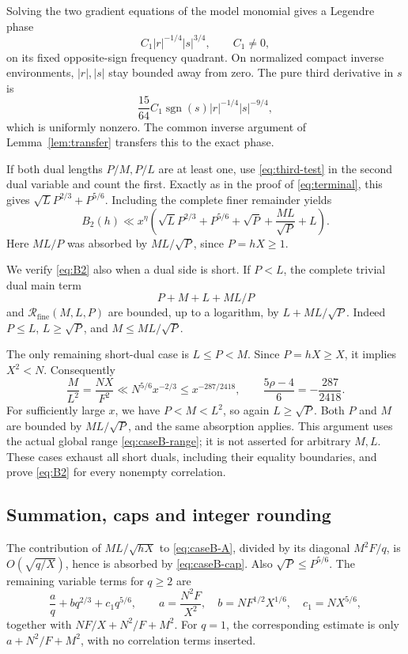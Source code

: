 \documentclass[11pt,a4paper]{article}
\numberwithin{equation}{section}
\theoremstyle{remark}
\newcommand{\Rfine}{\mathcal R_{\mathrm{fine}}}
\begin{document}
Solving the two gradient equations of the model monomial gives a Legendre
phase
\[
 C_1|r|^{-1/4}|s|^{3/4},\qquad C_1\ne0,
\]
on its fixed opposite-sign frequency quadrant. On normalized compact
inverse environments, $|r|,|s|$ stay bounded away from zero. The pure third
derivative in $s$ is
\[
 \frac{15}{64}C_1\operatorname{sgn}(s)
                      |r|^{-1/4}|s|^{-9/4},
\]
which is uniformly nonzero. The common inverse argument of
Lemma~\ref{lem:transfer} transfers this to the exact phase.

If both dual lengths $P/M,P/L$ are at least one, use
\eqref{eq:third-test} in the second dual variable and count the first.
Exactly as in the proof of \eqref{eq:terminal}, this gives
$\sqrt L P^{2/3}+P^{5/6}$. Including the complete finer remainder yields
\begin{equation}\label{eq:B2}
 B_2(h)\ll x^\eta\left(
       \sqrt L P^{2/3}+P^{5/6}+\sqrt P+\frac{ML}{\sqrt P}+L\right).
\end{equation}
Here $ML/P$ was absorbed by $ML/\sqrt P$, since $P=hX\ge1$.

We verify \eqref{eq:B2} also when a dual side is short. If $P<L$, the
complete trivial dual main term
\[
 P+M+L+ML/P
\]
and $\Rfine(M,L,P)$ are bounded, up to a logarithm, by
$L+ML/\sqrt P$. Indeed $P\le L$, $L\ge\sqrt P$, and
$M\le ML/\sqrt P$.

The only remaining short-dual case is $L\le P<M$. Since $P=hX\ge X$,
it implies $X^2<N$. Consequently
\begin{equation}\label{eq:B-short-margin}
 \frac{M}{L^2}=\frac{NX}{F^2}
 \ll N^{5/6}x^{-2/3}
 \le x^{-287/2418},\qquad
 \frac{5\rho-4}{6}=-\frac{287}{2418}.
\end{equation}
For sufficiently large $x$, we have $P<M<L^2$, so again
$L\ge\sqrt P$. Both $P$ and $M$ are bounded by $ML/\sqrt P$, and the
same absorption applies. This argument uses the actual global range
\eqref{eq:caseB-range}; it is not asserted for arbitrary $M,L$.
These cases exhaust all short duals, including their equality boundaries,
and prove \eqref{eq:B2} for every nonempty correlation.

\subsection{Summation, caps and integer rounding}
The contribution of $ML/\sqrt{hX}$ to \eqref{eq:caseB-A}, divided by its
diagonal $M^2F/q$, is $O(\sqrt{q/X})$, hence is absorbed by
\eqref{eq:caseB-cap}. Also $\sqrt P\le P^{5/6}$. The remaining variable
terms for $q\ge2$ are
\begin{equation}\label{eq:B-balance}
 \frac aq+bq^{2/3}+c_1q^{5/6},\qquad
 a=\frac{N^2F}{X^2},\quad b=NF^{1/2}X^{1/6},\quad c_1=NX^{5/6},
\end{equation}
together with $NF/X+N^2/F+M^2$. For $q=1$, the corresponding estimate is
only $a+N^2/F+M^2$, with no correlation terms inserted.
\end{document}

